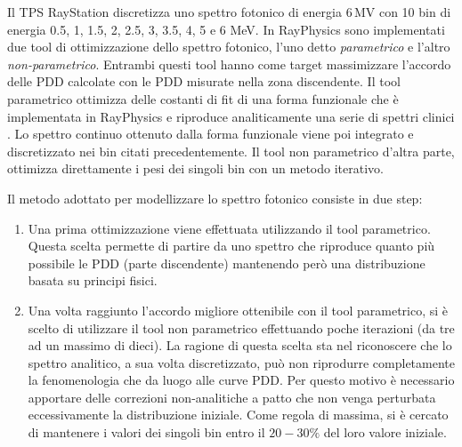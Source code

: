 Il TPS RayStation discretizza uno spettro fotonico di energia $6\,$MV con 10 bin di energia 0.5, 1, 1.5, 2, 2.5, 3, 3.5, 4, 5 e 6 MeV. In RayPhysics sono implementati due tool di ottimizzazione dello spettro fotonico, l'uno detto \textit{parametrico} e l'altro \textit{non-parametrico}. Entrambi questi tool hanno come target massimizzare l'accordo delle PDD calcolate con le PDD misurate nella zona discendente. Il tool parametrico ottimizza delle costanti di fit di una forma funzionale che è implementata in RayPhysics e riproduce analiticamente una serie di spettri clinici \cite{RaySearchLaboratories2014}. Lo spettro continuo ottenuto dalla forma funzionale viene poi integrato e discretizzato nei bin citati precedentemente. Il tool non parametrico d'altra parte, ottimizza direttamente i pesi dei singoli bin con un metodo iterativo.

Il metodo adottato per modellizzare lo spettro fotonico consiste in due step:
\begin{enumerate}
\item Una prima ottimizzazione viene effettuata utilizzando il tool parametrico. Questa scelta permette di partire da uno spettro che riproduce quanto più possibile le PDD (parte discendente) mantenendo però una distribuzione basata su principi fisici.
\item Una volta raggiunto l'accordo migliore ottenibile con il tool parametrico, si è scelto di utilizzare il tool non parametrico effettuando poche iterazioni (da tre ad un massimo di dieci). La ragione di questa scelta sta nel riconoscere che lo spettro analitico, a sua volta discretizzato, può non riprodurre completamente la fenomenologia che da luogo alle curve PDD. Per questo motivo è necessario apportare delle correzioni non-analitiche a patto che non venga perturbata eccessivamente la distribuzione iniziale. Come regola di massima, si è cercato di mantenere i valori dei singoli bin entro il $20-30\%$ del loro valore iniziale.
\end{enumerate}

